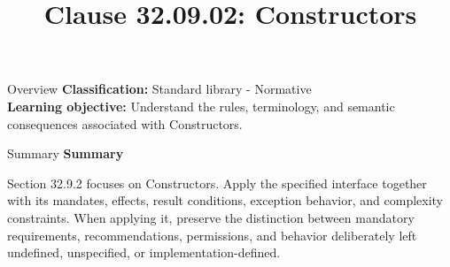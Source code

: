 \documentclass[10pt,letterpaper]{article}
\title{Clause 32.09.02: Constructors}
\author{}
\date{}
\begin{document}
\maketitle
\begin{CornellOverviewBox}{Overview}
\textbf{Classification:} Standard library - Normative\\[2pt]
\textbf{Learning objective:} Understand the rules, terminology, and semantic consequences associated with Constructors.
\end{CornellOverviewBox}\begin{CornellSummaryBox}{Summary}
{\sffamily\bfseries\color{Accent} Summary}\par\vspace{3pt}Section 32.9.2 focuses on Constructors. Apply the specified interface together with its mandates, effects, result conditions, exception behavior, and complexity constraints. When applying it, preserve the distinction between mandatory requirements, recommendations, permissions, and behavior deliberately left undefined, unspecified, or implementation-defined.
\end{CornellSummaryBox}
\end{document}
